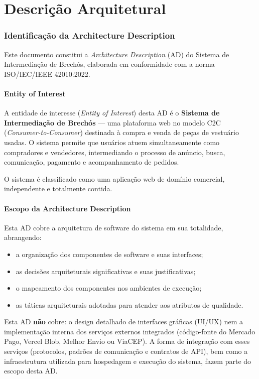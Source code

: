 ﻿\documentclass[12pt,a4paper]{article}
\begin{document}
\clearpage
\part{Descri\c{c}\~ao Arquitetural}
\section{Identificação da Architecture Description}

Este documento constitui a \textit{Architecture Description} (AD) do Sistema de Intermediação de Brechós, elaborada em conformidade com a norma ISO/IEC/IEEE 42010:2022.

\subsection{Entity of Interest}

A entidade de interesse (\textit{Entity of Interest}) desta AD é o \textbf{Sistema de Intermediação de Brechós} --- uma plataforma web no modelo C2C (\textit{Consumer-to-Consumer}) destinada à compra e venda de peças de vestuário usadas. O sistema permite que usuários atuem simultaneamente como compradores e vendedores, intermediando o processo de anúncio, busca, comunicação, pagamento e acompanhamento de pedidos.

O sistema é classificado como uma aplicação web de domínio comercial, independente e totalmente contida.

\subsection{Escopo da Architecture Description}

Esta AD cobre a arquitetura de software do sistema em sua totalidade, abrangendo:

\begin{itemize}[noitemsep]
    \item a organização dos componentes de software e suas interfaces;
    \item as decisões arquiteturais significativas e suas justificativas;
    \item o mapeamento dos componentes nos ambientes de execução;
    \item as táticas arquiteturais adotadas para atender aos atributos de qualidade.
\end{itemize}

Esta AD \textbf{não} cobre: o design detalhado de interfaces gráficas (UI/UX) nem a implementação interna dos serviços externos integrados (código-fonte do Mercado Pago, Vercel Blob, Melhor Envio ou ViaCEP). A forma de integração com esses serviços (protocolos, padrões de comunicação e contratos de API), bem como a infraestrutura utilizada para hospedagem e execução do sistema, fazem parte do escopo desta AD.
\end{document}
